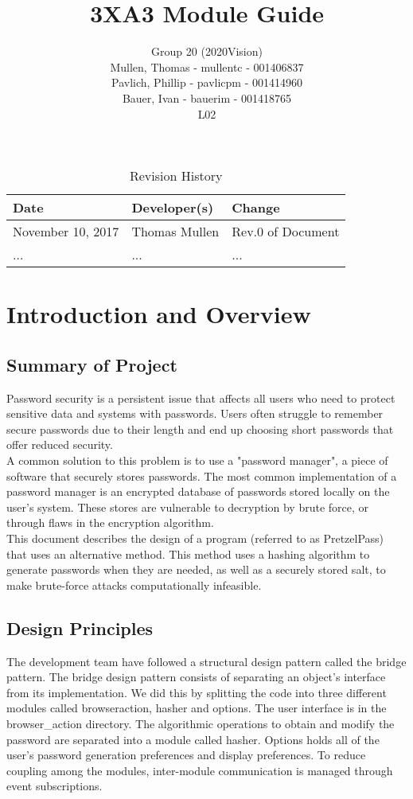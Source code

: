 \documentclass[12pt]{article}
\title{3XA3 Module Guide}
\author{Group 20 (2020Vision)\\
Mullen, Thomas - mullentc - 001406837\\
Pavlich, Phillip - pavlicpm - 001414960\\
Bauer, Ivan - bauerim - 001418765\\
L02}
\date{}
\begin{document}
\begin{table}[hp]
\caption{Revision History} \label{TblRevisionHistory}
\begin{tabularx}{\textwidth}{XXl}
\toprule
\textbf{Date} & \textbf{Developer(s)} & \textbf{Change}\\
\midrule
November 10, 2017 & Thomas Mullen & Rev.0 of Document\\
... & ... & ...\\
\bottomrule
\end{tabularx}
\end{table}
\newpage

\maketitle
\newpage

\tableofcontents

\section{Introduction and Overview}
\subsection{Summary of Project}
Password security is a persistent issue that affects all users who need to protect sensitive data and systems with passwords. Users often struggle to remember secure passwords due to their length and end up choosing short passwords that offer reduced security. \\

A common solution to this problem is to use a "password manager", a piece of software that securely stores passwords. The most common implementation of a password manager is an encrypted database of passwords stored locally on the user's system. These stores are vulnerable to decryption by brute force, or through flaws in the encryption algorithm. \\

This document describes the design of a program (referred to as PretzelPass) that uses an alternative method. This method uses a hashing algorithm to generate passwords when they are needed, as well as a securely stored salt, to make brute-force attacks computationally infeasible.

\subsection{Design Principles}
The development team have followed a structural design pattern called the bridge pattern. The bridge design pattern consists of separating an object's interface from its implementation. We did this by splitting the code into three different modules called browseraction, hasher and options. The user interface is in the browser\_action directory. The algorithmic operations to obtain and modify the password are separated into a module called hasher. Options holds all of the user's password generation preferences and display preferences. To reduce coupling among the modules, inter-module communication is managed through event subscriptions. \\
\end{document}
